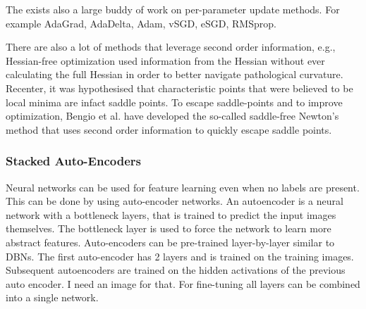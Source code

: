 \documentclass{report}
\begin{document}
The exists also a large buddy of work on per-parameter update methods. For
example AdaGrad, AdaDelta, Adam, vSGD, eSGD, RMSprop.

There are also a lot of methods that leverage second order information, e.g.,
Hessian-free optimization used information from the Hessian without ever
calculating the full Hessian in order to better navigate pathological curvature.
Recenter, it was hypothesised that characteristic points that were believed to
be local minima are infact saddle points. To escape saddle-points and to improve
optimization, Bengio et al. have developed the so-called saddle-free Newton's
method that uses second order information to quickly escape saddle points.

\subsubsection{Stacked Auto-Encoders}

Neural networks can be used for feature learning even when no labels are
present. This can be done by using auto-encoder networks. An autoencoder is a
neural network with a bottleneck layers, that is trained to predict the input
images themselves. The bottleneck layer is used to force the network to learn
more abstract features. Auto-encoders can be pre-trained layer-by-layer similar
to DBNs. The first auto-encoder has 2 layers and is trained on the training
images. Subsequent autoencoders are trained on the hidden activations of the
previous auto encoder. I need an image for that. For fine-tuning all layers can
be combined into a single network.
\end{document}
